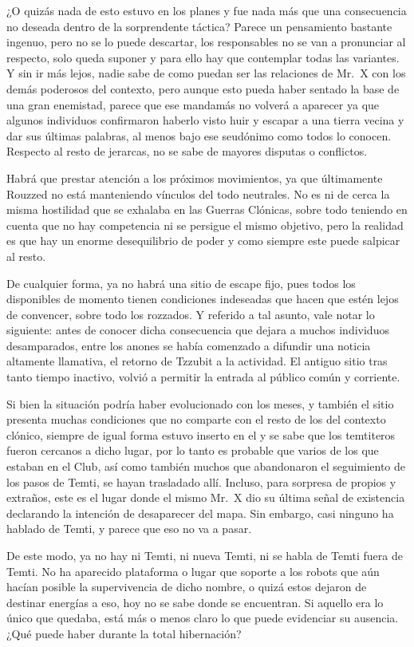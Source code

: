 \documentclass[
]{book}
\begin{document}
¿O quizás nada de esto estuvo en los planes y fue nada más que una consecuencia no deseada dentro de la sorprendente táctica? Parece un pensamiento bastante ingenuo, pero no se lo puede descartar, los responsables no se van a pronunciar al respecto, solo queda suponer y para ello hay que contemplar todas las variantes. Y sin ir más lejos, nadie sabe de como puedan ser las relaciones de Mr.~X con los demás poderosos del contexto, pero aunque esto pueda haber sentado la base de una gran enemistad, parece que ese mandamás no volverá a aparecer ya que algunos individuos confirmaron haberlo visto huir y escapar a una tierra vecina y dar sus últimas palabras, al menos bajo ese seudónimo como todos lo conocen. Respecto al resto de jerarcas, no se sabe de mayores disputas o conflictos.

Habrá que prestar atención a los próximos movimientos, ya que últimamente Rouzzed no está manteniendo vínculos del todo neutrales. No es ni de cerca la misma hostilidad que se exhalaba en las Guerras Clónicas, sobre todo teniendo en cuenta que no hay competencia ni se persigue el mismo objetivo, pero la realidad es que hay un enorme desequilibrio de poder y como siempre este puede salpicar al resto.

De cualquier forma, ya no habrá una sitio de escape fijo, pues todos los disponibles de momento tienen condiciones indeseadas que hacen que estén lejos de convencer, sobre todo los rozzados. Y referido a tal asunto, vale notar lo siguiente: antes de conocer dicha consecuencia que dejara a muchos individuos desamparados, entre los anones se había comenzado a difundir una noticia altamente llamativa, el retorno de Tzzubit a la actividad. El antiguo sitio tras tanto tiempo inactivo, volvió a permitir la entrada al público común y corriente.

Si bien la situación podría haber evolucionado con los meses, y también el sitio presenta muchas condiciones que no comparte con el resto de los del contexto clónico, siempre de igual forma estuvo inserto en el y se sabe que los temtiteros fueron cercanos a dicho lugar, por lo tanto es probable que varios de los que estaban en el Club, así como también muchos que abandonaron el seguimiento de los pasos de Temti, se hayan trasladado allí. Incluso, para sorpresa de propios y extraños, este es el lugar donde el mismo Mr.~X dio su última señal de existencia declarando la intención de desaparecer del mapa. Sin embargo, casi ninguno ha hablado de Temti, y parece que eso no va a pasar.

De este modo, ya no hay ni Temti, ni nueva Temti, ni se habla de Temti fuera de Temti. No ha aparecido plataforma o lugar que soporte a los robots que aún hacían posible la supervivencia de dicho nombre, o quizá estos dejaron de destinar energías a eso, hoy no se sabe donde se encuentran. Si aquello era lo único que quedaba, está más o menos claro lo que puede evidenciar su ausencia. ¿Qué puede haber durante la total hibernación?
\end{document}
